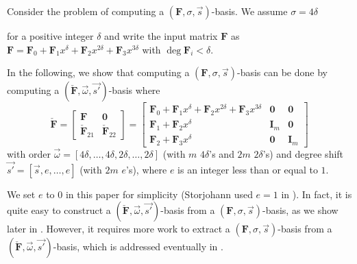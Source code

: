 Consider the problem of computing a $\left(\mathbf{F},\sigma,\vec{s}\right)$-basis.
We assume $\sigma=4\delta$ %
\begin{comment}
(The results below hold for any positive integer great than one, but
4 is used for simplicity. ) 
\end{comment}
{}for a positive integer $\delta$ and write the input matrix $\mathbf{F}$
as $\mathbf{F}=\mathbf{F}_{0}+\mathbf{F}_{1}x^{\delta}+\mathbf{F}_{2}x^{2\delta}+\mathbf{F}_{3}x^{3\delta}$
with $\deg\mathbf{F}_{i}<\delta$.%
\begin{comment}
again, changed from $\deg\mathbf{F}_{i}\le\delta-1$ to $\deg\mathbf{F}_{i}<\delta$
even though I prefer $\le$ 
\end{comment}
{} In the following, we show that computing a $\left(\mathbf{F},\sigma,\vec{s}\right)$-basis
can be done by computing a $(\check{\mathbf{F}},\vec{\omega},\vec{s'})$-basis
where \begin{equation}
\check{\mathbf{F}}=\left[\begin{array}{cc}
\mathbf{F} & \mathbf{0}\\
\check{\mathbf{F}}_{21} & \check{\mathbf{F}}_{22}\end{array}\right]=\left[\begin{array}{l|cr}
\mathbf{F}_{0}+\mathbf{F}_{1}x^{\delta}+\mathbf{F}_{2}x^{2\delta}+\mathbf{F}_{3}x^{3\delta} & \mathbf{0} & \mathbf{0}\\
\hline \mathbf{F}_{1}+\mathbf{F}_{2}x^{\delta} & \mathbf{I}_{m} & \mathbf{0}\\
\mathbf{F}_{2}+\mathbf{F}_{3}x^{\delta} & \mathbf{0} & \mathbf{I}_{m}\end{array}\right]\label{eq:extendedSTransformTop}\end{equation}
 with order $\vec{\omega}=\left[4\delta,\dots,4\delta,2\delta,\dots,2\delta\right]$
(with $m$ $4\delta$'s and $2m$ $2\delta$'s) and degree shift $\vec{s'}=\left[\vec{s},e,\dots,e\right]$
(with $2m$ $e$'s), where $e$ is an integer less than or equal to
$1$. %
\begin{comment}
actually true for $e\le\min\vec{s}+1$. keeping this $e$ helps to
show that this hold true in more general situations, while Storjohann
only used $e=1$. it can be negative as well. 
\end{comment}
{}We set $e$ to $0$ in this paper for simplicity (Storjohann used
$e=1$ in \citep{Storjohann:2006}). In fact, it is quite easy to
construct a $(\check{\mathbf{F}},\vec{\omega},\vec{s'})$-basis from
a $\left(\mathbf{F},\sigma,\vec{s}\right)$-basis, as we show later
in . However, it requires more work to extract
a $\left(\mathbf{F},\sigma,\vec{s}\right)$-basis from a $(\check{\mathbf{F}},\vec{\omega},\vec{s'})$-basis,
which is addressed eventually in .

